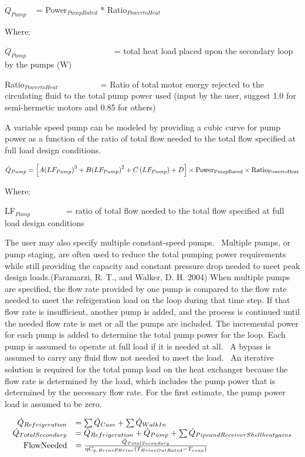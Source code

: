 \({\dot Q_{Pump}}\) ~ = Power\(_{PumpRated}\) * Ratio\(_{PowertoHeat}\)

Where:

\({\dot Q_{Pump}}\) ~~~~~~~~~~~~~~~~~~~~ = total heat load placed upon the secondary loop by the pumps (W)

Ratio\(_{PowertoHeat}\) ~~~~~~~~~ = Ratio of total motor energy rejected to the circulating fluid to the total pump power used (input by the user, suggest 1.0 for semi-hermetic motors and 0.85 for others)

A variable speed pump can be modeled by providing a cubic curve for pump power as a function of the ratio of total flow needed to the total flow specified at full load design conditions.

\begin{equation}
{\dot Q_{Pump}} = \left[ {A{{\left( {L{F_{Pump}}} \right)}^3} + B{{\left( {L{F_{Pump}}} \right)}^2} + C\left( {L{F_{Pump}}} \right) + D} \right] \times {\rm{Powe}}{{\rm{r}}_{{\rm{PumpRated}}}} \times {\rm{Rati}}{{\rm{o}}_{{\rm{PowertoHeat}}}}
\end{equation}

Where:

LF\(_{Pump}\)~~~~~~~~ = ratio of total flow needed to the total flow specified at full load design conditions

The user may also specify multiple constant-speed pumps.~ Multiple pumps, or pump staging, are often used to reduce the total pumping power requirements while still providing the capacity and constant pressure drop needed to meet peak design loads.(Faramarzi, R. T., and Walker, D. H. 2004) When multiple pumps are specified, the flow rate provided by one pump is compared to the flow rate needed to meet the refrigeration load on the loop during that time step. If that flow rate is insufficient, another pump is added, and the process is continued until the needed flow rate is met or all the pumps are included. The incremental power for each pump is added to determine the total pump power for the loop. Each pump is assumed to operate at full load if it is needed at all.~ A bypass is assumed to carry any fluid flow not needed to meet the load.~ An iterative solution is required for the total pump load on the heat exchanger because the flow rate is determined by the load, which includes the pump power that is determined by the necessary flow rate. For the first estimate, the pump power load is assumed to be zero.

\begin{equation}
  \begin{array}{rl}
    \dot{Q}_{Refrigeration} &= \sum \dot{Q}_{Case} + \sum \dot{Q}_{WalkIn} \\
    \dot{Q}_{TotalSecondary} &= \dot{Q}_{Refrigeration} + \dot{Q}_{Pump} + \sum \dot{Q}_{Pipe and Receiver Shell heat gains} \\
    \text{FlowNeeded} &= \frac{\dot{Q}_{TotalSecondary}}{\eta C_{p,Brine} \rho_{Brine}\left(T_{BrineOutRated} - T_{evap}\right)}
  \end{array}
\end{equation}

